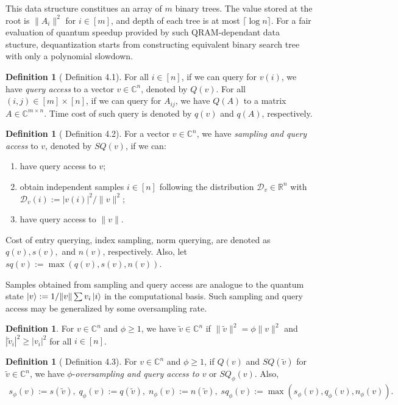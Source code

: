 \documentclass[10pt,twoside,reqno]{amsart} %
\theoremstyle{plain}
\theoremstyle{definition}
\newtheorem{defn}[thm]{Definition}
\begin{document}
This data structure constitues an array of $m$  binary trees. The value
stored at the root is $\|A_i\|^2$ for $i\in[m]$, and depth of each tree is
at most $\lceil\log n\rceil$. For a fair evaluation of quantum speedup
provided by such QRAM-dependant data stucture, dequantization starts
from constructing equivalent binary search tree with only a polynomial
slowdown.
\begin{defn}[\cite{tang2023} Definition 4.1]
  For all $i\in[n]$, if we can query for $v(i)$, we have \emph{query access}
  to a vector $v\in\mathbb{C}^n$, denoted by $Q(v)$. For all 
  $(i,j)\in[m]\times[n]$, if we can query for $A_{ij}$, we have $Q(A)$ to
  a matrix $A\in\mathbb{C}^{m\times n}$. Time cost of such query is denoted
  by $q(v)$ and $q(A)$, respectively.
\end{defn}
\begin{defn}[\cite{tang2023} Definition 4.2]
  For a vector $v\in\mathbb{C}^n$, we have \emph{sampling and query access} to
  $v$, denoted by $SQ(v)$, if we can:
  \begin{enumerate}
    \item have query access to $v$;
    \item obtain independent samples $i\in[n]$ following the distribution
      $\mathcal{D}_v\in\mathbb{R}^n$ with $\mathcal{D}_v(i):=|v(i)|^2/\|v\|^2$;
    \item have query access to $\|v\|$.
  \end{enumerate}
  Cost of entry querying, index sampling, norm querying, are denoted as
  $q(v),s(v),$ and $n(v)$, respectively. Also, let $sq(v):=\max(q(v),s(v),n(v))$.
\end{defn}
Samples obtained from sampling and query access are analogue to the quantum
state $\ket{v} := 1/\|v\|\sum v_i\ket{i}$ in the computational basis. Such
sampling and query access may be generalized by some oversampling rate.
\begin{defn}
  For $v\in\mathbb{C}^n$ and $\phi\geq1$, we have
  $\widetilde{v}\in\mathbb{C}^n$ if $\|\widetilde{v}\|^2=\phi\|v\|^2$ and
  $|\widetilde{v}_i|^2\geq |v_i|^2$ for all $i\in[n]$.
\end{defn}
\begin{defn}[\cite{tang2023} Definition 4.3]
  For $v\in\mathbb{C}^n$ and $\phi\geq1$, if $Q(v)$ and 
  $SQ(\widetilde{v})$ for $\widetilde{v}\in\mathbb{C}^n$, we have 
  $\phi$-\emph{oversampling and query access to $v$} or $SQ_{\phi}(v)$. Also,
  \begin{align*}
    s_{\phi}(v) := s(\widetilde{v}),\;
    q_{\phi}(v) := q(\widetilde{v}),\;
    n_{\phi}(v) := n(\widetilde{v}),\;
    sq_{\phi}(v) := \max(s_{\phi}(v),q_{\phi}(v),n_{\phi}(v)).
  \end{align*}
\end{defn}
\end{document}
